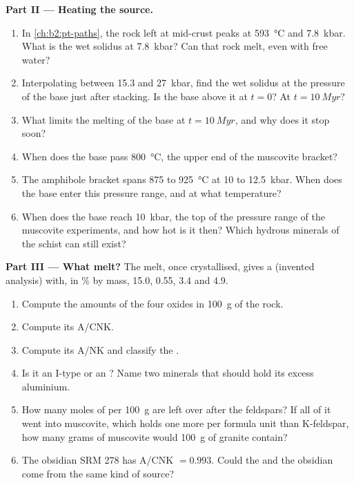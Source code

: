 \begin{problem}
\noindent\textbf{Part II --- Heating the source.}
\begin{enumerate}[resume]
\item In \cref{ch:b2:pt-paths}, the rock left at mid-crust peaks at \qty{593}{\celsius}
and \qty{7.8}{kbar}. What is the wet solidus at \qty{7.8}{kbar}? Can that rock melt, even
with free water?
\item Interpolating between 15.3 and \qty{27}{kbar}, find the wet solidus at the pressure
of the base just after stacking. Is the base above it at $t = 0$? At $t = \qty{10}{Myr}$?
\item What limits the melting of the base at $t = \qty{10}{Myr}$, and why does it stop
soon?
\item When does the base pass \qty{800}{\celsius}, the upper end of the muscovite
bracket?
\item The amphibole bracket spans 875 to \qty{925}{\celsius} at 10 to \qty{12.5}{kbar}.
When does the base enter this pressure range, and at what temperature?
\item When does the base reach \qty{10}{kbar}, the top of the pressure range of the
muscovite experiments, and how hot is it then? Which hydrous minerals of the schist can
still exist?
\end{enumerate}

\noindent\textbf{Part III --- What melt?}
The melt, once crystallised, gives a  (invented analysis) with, in
\unit{\percent} by mass,  15.0,  0.55,  3.4 and  4.9.
\begin{enumerate}[resume]
\item Compute the amounts of the four oxides in \qty{100}{\gram} of the rock.
\item Compute its A/CNK.
\item Compute its A/NK and classify the .
\item Is it an I-type or an ? Name two minerals that should hold its excess
aluminium.
\item How many moles of  per \qty{100}{\gram} are left over after the
feldspars? If all of it went into muscovite, which holds one more  per formula
unit than K-feldspar, how many grams of muscovite would \qty{100}{\gram} of granite
contain?
\item The obsidian SRM 278 has A/CNK $= 0.993$. Could the  and the obsidian
come from the same kind of source?
\end{enumerate}


\end{problem}
